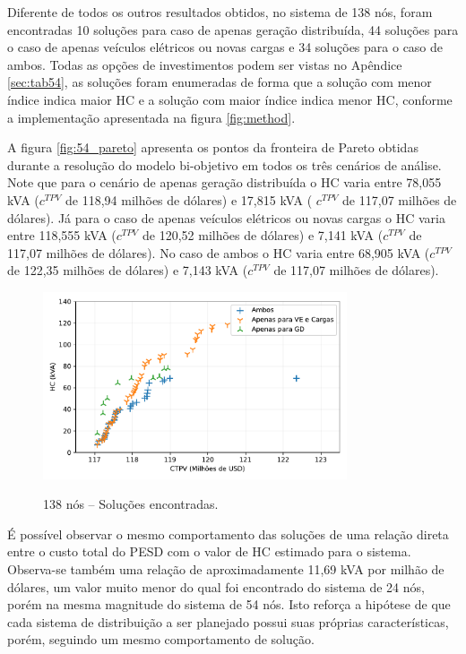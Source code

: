 Diferente de todos os outros resultados obtidos, no sistema de 138 nós, foram encontradas 10 soluções para caso de apenas geração distribuída, 44 soluções para o caso de apenas veículos elétricos ou novas cargas e 34 soluções para o caso de ambos. Todas as opções de investimentos podem ser vistas no Apêndice \ref{sec:tab54}, as soluções foram enumeradas de forma que a solução com menor índice indica maior \ac{HC} e a solução com maior índice indica menor \ac{HC}, conforme a implementação apresentada na figura \ref{fig:method}.

A figura  \ref{fig:54_pareto} apresenta os pontos da fronteira de Pareto obtidas durante a resolução do modelo bi-objetivo em todos os três cenários de análise. Note que para o cenário de apenas geração distribuída o \ac{HC} varia entre 78,055 kVA ($c^{TPV}$ de 118,94 milhões de dólares) e  17,815 kVA ( $c^{TPV}$ de 117,07 milhões de dólares). Já para o caso de apenas veículos elétricos ou novas cargas o \ac{HC} varia entre 118,555 kVA ($c^{TPV}$ de 120,52 milhões de dólares) e 7,141 kVA ($c^{TPV}$ de 117,07 milhões de dólares). No caso de ambos o \ac{HC} varia entre 68,905 kVA ($c^{TPV}$ de 122,35 milhões de dólares) e 7,143 kVA ($c^{TPV}$ de 117,07 milhões de dólares).

\begin{figure}[h]
 	\centering
    \caption{138 nós -- Soluções encontradas.}
    \includegraphics[width=0.8\textwidth]{cap4/resultados/138_pareto.pdf}\\
    \label{fig:138_pareto}
\end{figure}

É possível observar o mesmo comportamento das soluções de uma relação direta entre o custo total do \ac{PESD} com o valor de \ac{HC} estimado para o sistema. Observa-se também uma relação de aproximadamente 11,69 kVA por milhão de dólares, um valor muito menor do qual foi encontrado do sistema de 24 nós, porém na mesma magnitude do sistema de 54 nós. Isto reforça a hipótese de que cada sistema de distribuição a ser planejado possui suas próprias características, porém, seguindo um mesmo comportamento de solução. 

